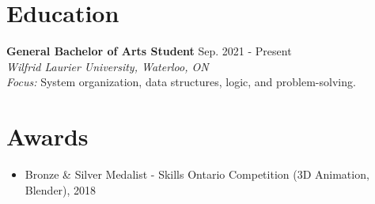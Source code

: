 \documentclass[a4paper,10pt]{article}
\begin{document}
\section*{Education}
\textbf{General Bachelor of Arts Student} \hfill Sep. 2021 - Present \\
\textit{Wilfrid Laurier University, Waterloo, ON} \\
\textit{Focus:} System organization, data structures, logic, and problem-solving.

\section*{Awards}
\begin{itemize}
    \item Bronze \& Silver Medalist - Skills Ontario Competition (3D Animation, Blender), 2018
\end{itemize}
\end{document}
